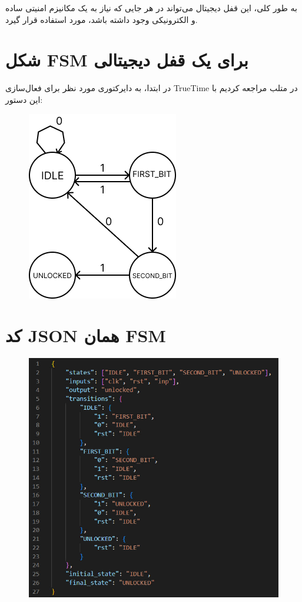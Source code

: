 به طور کلی، این قفل دیجیتال می‌تواند در هر جایی که نیاز به یک مکانیزم امنیتی ساده و الکترونیکی وجود داشته باشد، مورد استفاده قرار گیرد.

\newpage

\section*{شکل FSM برای یک قفل دیجیتالی}

در ابتدا، به دایرکتوری مورد نظر برای فعال‌سازی TrueTime در متلب مراجعه کردیم با این دستور:
\begin{figure}[h]
	\centering
	\includegraphics{1.png}
	\label{fig:label4}
\end{figure}

\newpage

\section*{کد JSON همان FSM}

\begin{figure}[h]
	\centering
	\includegraphics{2.jpg}
	\label{fig:label4}
\end{figure}

